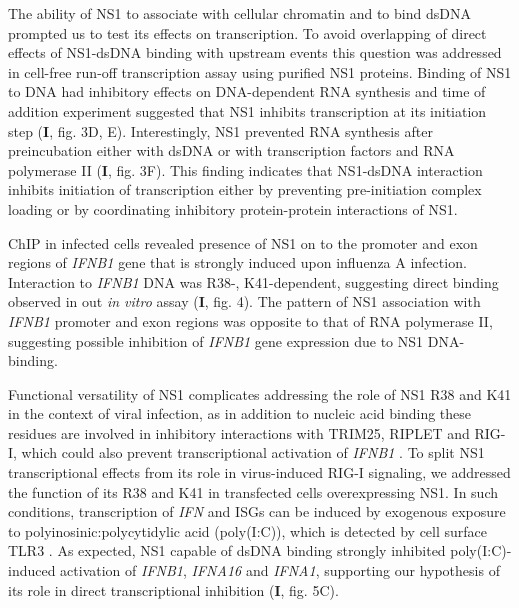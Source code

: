 		The ability of NS1 to associate with cellular chromatin and to bind dsDNA prompted us to test its effects on transcription. To avoid overlapping of direct effects of NS1-dsDNA binding with upstream events this question was addressed in cell-free run-off transcription assay using purified NS1 proteins. Binding of NS1 to DNA had inhibitory effects on DNA-dependent RNA synthesis and time of addition experiment suggested that NS1 inhibits transcription at its initiation step (\textbf{I}, fig. 3D, E). Interestingly, NS1 prevented RNA synthesis after preincubation either with dsDNA or with transcription factors and RNA polymerase II (\textbf{I}, fig. 3F). This finding indicates that NS1-dsDNA interaction inhibits initiation of transcription either by preventing pre-initiation complex loading or by coordinating inhibitory protein-protein interactions of NS1.
		
		\Gls{ChIP} in infected cells revealed presence of NS1 on to the promoter and exon regions of \textit{IFNB1} gene that is strongly induced upon influenza A infection. Interaction to \textit{IFNB1} DNA was R38-, K41-dependent, suggesting direct binding observed in out \textit{in vitro} assay (\textbf{I}, fig. 4). The pattern of NS1 association with \textit{IFNB1} promoter and exon regions was opposite to that of RNA polymerase II, suggesting possible inhibition of \textit{IFNB1} gene expression due to NS1 DNA-binding. 
		
		Functional versatility of NS1 complicates addressing the role of NS1 R38 and K41 in the context of viral infection, as in addition to nucleic acid binding these residues are involved in inhibitory interactions with TRIM25, RIPLET and \gls{RIG-I}, which could also prevent transcriptional activation of \textit{IFNB1} \parencite{Gack2009, Rajsbaum2012}. To split NS1 transcriptional effects from its role in virus-induced \gls{RIG-I} signaling, we addressed the function of its R38 and K41 in transfected cells overexpressing NS1. In such conditions, transcription of \textit{IFN} and \gls{ISG}s can be induced by exogenous exposure to polyinosinic:polycytidylic acid (poly(I:C)), which is detected by cell surface \gls{TLR}3 \parencite{Karpala2005}. As expected, NS1 capable of dsDNA binding strongly inhibited poly(I:C)-induced activation of \textit{IFNB1}, \textit{IFNA16} and \textit{IFNA1}, supporting our hypothesis of its role in direct transcriptional inhibition (\textbf{I}, fig. 5C).
		
